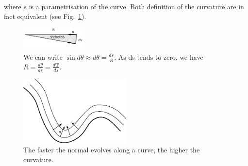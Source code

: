 \documentclass[11pt,a4paper]{article}
\begin{document}
	where $s$ is a parametrisation of the curve. Both definition of the curvature
	are in fact equivalent (see Fig.~\ref{fig:theta}). 
	
	\begin{figure}
		\centering
		\includegraphics[width=0.3\textwidth]{Drawings/theta.pdf}
		\caption{We can write $\sin d\theta \approx d\theta = \frac{ds}{R}$. As ds tends to zero, we have $R = \frac{d\theta}{ds} = \frac{d \mathbf{T}}{ds}$.\label{fig:theta}}
	\end{figure}
	
	\begin{figure}
		\centering
		\includegraphics[width=0.5\textwidth]{Drawings/Distance.pdf}
		\caption{The faster the normal evolves along a curve, the higher the curvature.}
	\end{figure}
	
\end{document}
